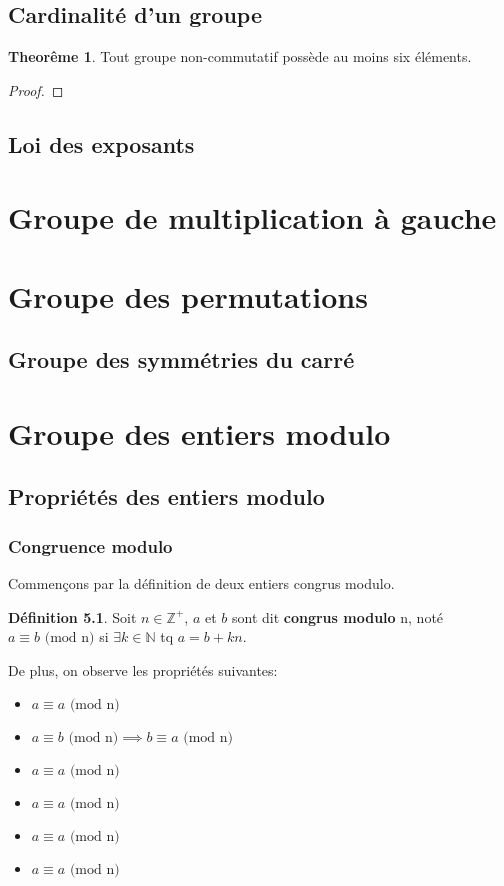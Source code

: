 \documentclass[12pt]{book}
\let\Bbb\mathbb
\theoremstyle{definition}
\newtheorem{definition}{Définition}[section]
\newtheorem{theorem}{Theorême}[section]
\begin{document}
\section{Cardinalité d'un groupe}
\begin{theorem}
    Tout groupe non-commutatif possède au moins six éléments.
\end{theorem}
\begin{proof}
\end{proof}
\section{Loi des exposants}
\chapter{Groupe de multiplication à gauche}
\chapter{Groupe des permutations}
\section{Groupe des symmétries du carré}
\chapter{Groupe des entiers modulo}
\section{Propriétés des entiers modulo}
\subsection{Congruence modulo}

Commençons par la définition de deux entiers congrus modulo.

\begin{definition}
    \label{def:mod}
    Soit $n \in \Bbb Z^+$, $a$ et $b$ sont dit \textbf{congrus modulo} n, noté $a \equiv b\text{ (mod n)}$
    si $\exists k \in \Bbb N $ tq $ a = b + kn$.
\end{definition}

De plus, on observe les propriétés suivantes:
\begin{itemize}
    \item $a \equiv a\text{ (mod n)}$
    \item $a \equiv b\text{ (mod n)} \implies b \equiv a\text{ (mod n)}$
    \item $a \equiv a\text{ (mod n)}$
    \item $a \equiv a\text{ (mod n)}$
    \item $a \equiv a\text{ (mod n)}$
    \item $a \equiv a\text{ (mod n)}$
\end{itemize}
\end{document}
